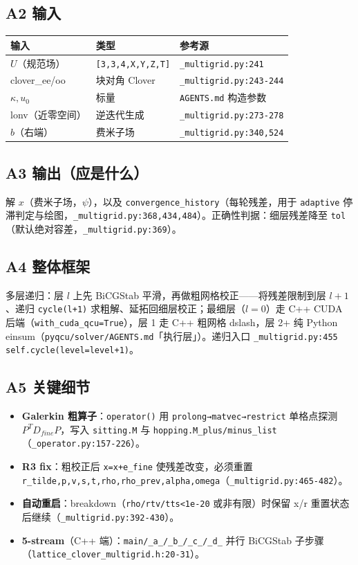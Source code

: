 \documentclass[UTF8]{ctexart}
\begin{document}
\subsection{A2 输入}
\begin{xltabular}{\textwidth}{llX}
\toprule
\textcolor{relation}{输入} & 类型 & 参考源 \\
\midrule
\endhead
$U$（规范场） & \texttt{[3,3,4,X,Y,Z,T]} & \texttt{\_multigrid.py:241} \\
clover\_ee/oo & 块对角 Clover & \texttt{\_multigrid.py:243-244} \\
$\kappa, u_0$ & 标量 & \texttt{AGENTS.md} 构造参数 \\
lonv（近零空间） & 逆迭代生成 & \texttt{\_multigrid.py:273-278} \\
$b$（右端） & 费米子场 & \texttt{\_multigrid.py:340,524} \\
\bottomrule
\end{xltabular}

\subsection{A3 输出（应是什么）}
解 $x$（费米子场，$\psi$），以及 \texttt{convergence\_history}（每轮残差，用于 \texttt{adaptive} 停滞判定与绘图，\texttt{\_multigrid.py:368,434,484}）。正确性判据：细层残差降至 \texttt{tol}（默认绝对容差，\texttt{\_multigrid.py:369}）。

\subsection{A4 整体框架}
多层递归：层 $l$ 上先 BiCGStab 平滑，再做粗网格校正——将残差限制到层 $l+1$、递归 \texttt{cycle(l+1)} 求粗解、延拓回细层校正；最细层（$l=0$）走 C++ CUDA 后端（\texttt{with\_cuda\_qcu=True}），层 1 走 C++ 粗网格 dslash，层 2+ 纯 Python einsum（\texttt{pyqcu/solver/AGENTS.md}「执行层」）。递归入口 \texttt{\_multigrid.py:455} \texttt{self.cycle(level=level+1)}。

\subsection{A5 关键细节}
\begin{itemize}
  \item \textbf{Galerkin 粗算子}：\texttt{operator()} 用 \texttt{prolong→matvec→restrict} 单格点探测 $P^T D_{fine} P$，写入 \texttt{sitting.M} 与 \texttt{hopping.M\_plus/minus\_list}（\texttt{\_operator.py:157-226}）。
  \item \textbf{R3 fix}：粗校正后 \texttt{x=x+e\_fine} 使残差改变，必须重置 \nolinkurl{r_tilde,p,v,s,t,rho,rho_prev,alpha,omega}（\texttt{\_multigrid.py:465-482}）。
  \item \textbf{自动重启}：breakdown（\nolinkurl{rho/rtv/tts<1e-20} 或非有限）时保留 x/r 重置状态后继续（\nolinkurl{_multigrid.py:392-430}）。
  \item \textbf{5-stream}（C++ 端）：\nolinkurl{main/_a_/_b_/_c_/_d_} 并行 BiCGStab 子步骤（\nolinkurl{lattice_clover_multigrid.h:20-31}）。
\end{itemize}
\end{document}

